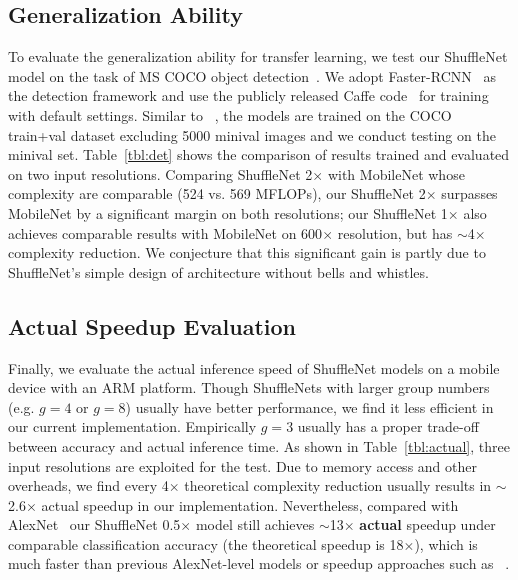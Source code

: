 \documentclass[10pt,twocolumn,letterpaper]{article}
\begin{document}
\subsection{Generalization Ability}
To evaluate the generalization ability for transfer learning, we test our ShuffleNet model on the task of MS COCO object detection~\cite{lin2014microsoft}. We adopt Faster-RCNN~\cite{ren2015faster} as the detection framework and use the publicly released Caffe code~\cite{ren2015faster,jia2014caffe} for training with default settings. Similar to ~\cite{howard2017mobilenets}, the models are trained on the COCO train+val dataset excluding 5000 minival images and we conduct testing on the minival set. Table~\ref{tbl:det} shows the comparison of results trained and evaluated on two input resolutions. Comparing ShuffleNet 2$\times$ with MobileNet whose complexity are comparable (524 vs. 569 MFLOPs), our ShuffleNet 2$\times$ surpasses MobileNet by a significant margin on both resolutions; our ShuffleNet 1$\times$ also achieves comparable results with MobileNet on 600$\times$ resolution, but has $\sim$4$\times$ complexity reduction. We conjecture that this significant gain is partly due to ShuffleNet's simple design of architecture without bells and whistles.  


\subsection{Actual Speedup Evaluation}
\label{sec:actual}

Finally, we evaluate the actual inference speed of ShuffleNet models on a mobile device with an ARM platform. Though ShuffleNets with larger group numbers (e.g. $g=4$ or $g=8$) usually have better performance, we find it less efficient in our current implementation. Empirically $g=3$ usually has a proper trade-off between accuracy and actual inference time. As shown in Table~\ref{tbl:actual}, three input resolutions are exploited for the test. Due to memory access and other overheads, we find every 4$\times$ theoretical complexity reduction usually results in $\sim$2.6$\times$ actual speedup in our implementation. Nevertheless, compared with AlexNet~\cite{krizhevsky2012imagenet} our ShuffleNet 0.5$\times$ model still achieves $\sim$13$\times$ \textbf{actual} speedup under comparable classification accuracy (the theoretical speedup is 18$\times$), which is much faster than previous AlexNet-level models or speedup approaches such as ~\cite{iandola2016squeezenet,jaderberg2014speeding,lebedev2014speeding,zhang2016accelerating,zhang2015efficient,wen2016learning}. 
\end{document}
